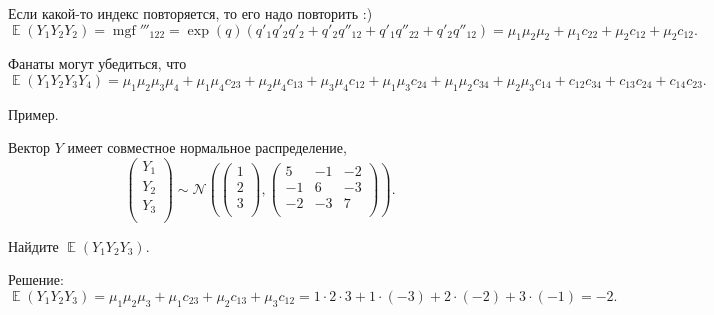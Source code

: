 \documentclass[12pt]{article}
\DeclareMathOperator{\E}{\mathbb{E}}
\DeclareMathOperator{\mgf}{mgf}
\newcommand{\cN}{\mathcal{N}}
\begin{document}
Если какой-то индекс повторяется, то его надо повторить :)
\[
    \E(Y_1 Y_2 Y_2) = \mgf'''_{122} = \exp(q) (q'_1 q'_2 q'_2 + q'_2 q''_{12} + q'_1 q''_{22} + q'_2 q''_{12}) = \mu_1 \mu_2\mu_2 + \mu_1 c_{22} + \mu_2 c_{12} + \mu_2 c_{12}.
\]

Фанаты могут убедиться, что 
\[
    \E(Y_1 Y_2 Y_3 Y_4) = \mu_1 \mu_2\mu_3 \mu_4 + \mu_1 \mu_4 c_{23} + \mu_2 \mu_4 c_{13} + \mu_3 \mu_4 c_{12} + \mu_1 \mu_3 c_{24} + \mu_1 \mu_2 c_{34} + \mu_2 \mu_3 c_{14} +  c_{12}c_{34} + c_{13}c_{24} + c_{14}c_{23}.
\]


Пример.

Вектор $Y$ имеет совместное нормальное распределение,
\[
\begin{pmatrix}
    Y_1 \\
    Y_2 \\
    Y_3 \\
\end{pmatrix} \sim \cN\left(
\begin{pmatrix}
    1 \\
    2 \\
    3 \\
\end{pmatrix},
\begin{pmatrix}
    5 & -1 & -2 \\
    -1 & 6 & -3 \\
    -2 & -3 & 7 \\
\end{pmatrix}
\right).
\]

Найдите $\E(Y_1 Y_2 Y_3)$.


Решение:
\[
    \E(Y_1 Y_2 Y_3)  = \mu_1 \mu_2\mu_3 + \mu_1 c_{23} + \mu_2 c_{13} + \mu_3 c_{12} = 1\cdot 2 \cdot 3 + 1 \cdot (-3) + 2 \cdot (-2) + 3\cdot (-1) = -2.
\]
\end{document}

